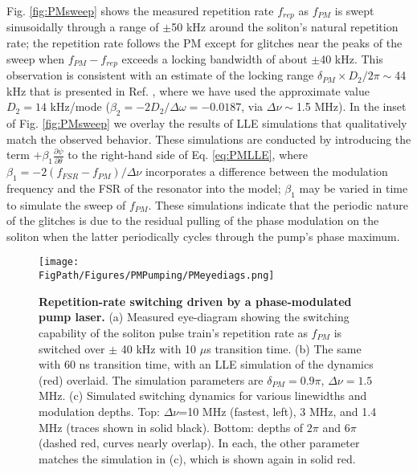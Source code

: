 Fig. \ref{fig:PMsweep} shows the measured repetition rate $f_{rep}$ as $f_{PM}$ is swept sinusoidally through a range of $\pm$50 kHz around the soliton's natural repetition rate; the repetition rate follows the PM except for glitches near the peaks of the sweep when $f_{PM}-f_{rep}$ exceeds a locking bandwidth of about $\pm$40 kHz. This observation is consistent with an estimate of the locking range $\delta_{PM}\times D_2/2\pi\sim$44 kHz that is presented in Ref. , where we have used the approximate value $D_2=14$ kHz/mode ($\beta_2=-2D_2/\Delta\omega=-0.0187$, via $\Delta\nu\sim$1.5 MHz). In the inset of Fig. \ref{fig:PMsweep} we overlay the results of LLE simulations that qualitatively match the observed behavior. These simulations are conducted by introducing the term $+\beta_1\frac{\partial\psi}{\partial\theta}$ to the right-hand side of Eq. \ref{eq:PMLLE}, where $\beta_1=-2(f_{FSR}-f_{PM})/\Delta\nu$ incorporates a difference between the modulation frequency and the FSR of the resonator into the model; $\beta_1$ may be varied in time to simulate the sweep of $f_{PM}$. These simulations indicate that the periodic nature of the glitches is due to the residual pulling of the phase modulation on the soliton when the latter periodically cycles through the pump's phase maximum.



\begin{figure}[htpb]
	\begin{center}
		\texttt{[image: \\FigPath/Figures/PMPumping/PMeyediags.png]}
	\end{center}
	\caption[Repetition-rate switching driven by a phase-modulated pump laser]{\textbf{Repetition-rate switching driven by a phase-modulated pump laser.} (a) Measured eye-diagram showing the switching capability of the soliton pulse train's repetition rate as $f_{PM}$ is switched over $\pm$ 40 kHz with 10 $\mu$s transition time. (b) The same with 60 ns transition time, with an LLE simulation of the dynamics (red) overlaid. The simulation parameters are $\delta_{PM}=0.9\pi$, $\Delta\nu=1.5$ MHz. (c) Simulated switching dynamics for various linewidths and modulation depths. Top: $\Delta\nu$=10 MHz (fastest, left), 3 MHz, and 1.4 MHz (traces shown in solid black). Bottom: depths of $2\pi$ and $6\pi$ (dashed red, curves nearly overlap). In each, the other parameter matches the simulation in (c), which is shown again in solid red. }
	\label{fig:PMeyediags}
\end{figure} 

